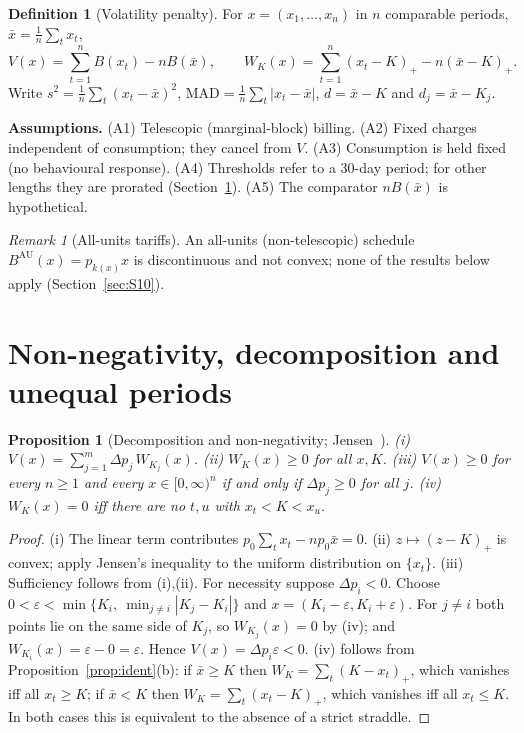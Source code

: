\documentclass[11pt,a4paper]{article}
\newtheorem{proposition}{Proposition}
\theoremstyle{definition}
\newtheorem{definition}{Definition}
\theoremstyle{plain}\newtheorem{sprop}{Proposition}[section]\newtheorem{slemma}[sprop]{Lemma}\newtheorem{scor}[sprop]{Corollary}
\theoremstyle{definition}
\theoremstyle{remark}
\newtheorem{remark}{Remark}
\newcommand{\xbar}{\bar{x}}
\newcommand{\pos}[1]{\left(#1\right)_{+}}
\numberwithin{equation}{section}
\begin{document}
\begin{definition}[Volatility penalty]
For $x=(x_1,\dots,x_n)$ in $n$ comparable periods, $\xbar=\frac1n\sum_tx_t$,
\[
V(x)=\sum_{t=1}^nB(x_t)-nB(\xbar),\qquad W_K(x)=\sum_{t=1}^n\pos{x_t-K}-n\pos{\xbar-K}.
\]
Write $s^2=\frac1n\sum_t(x_t-\xbar)^2$, $\mathrm{MAD}=\frac1n\sum_t|x_t-\xbar|$, $d=\xbar-K$ and $d_j=\xbar-K_j$.
\end{definition}

\noindent\textbf{Assumptions.} (A1) Telescopic (marginal-block) billing. (A2) Fixed charges independent of consumption; they cancel from $V$. (A3) Consumption is held fixed (no behavioural response). (A4) Thresholds refer to a 30-day period; for other lengths they are prorated (Section~\ref{sec:S2}). (A5) The comparator $nB(\xbar)$ is hypothetical.

\begin{remark}[All-units tariffs]
An all-units (non-telescopic) schedule $B^{\mathrm{AU}}(x)=p_{k(x)}x$ is discontinuous and not convex; none of the results below apply (Section~\ref{sec:S10}).
\end{remark}

\section{Non-negativity, decomposition and unequal periods}\label{sec:S2}

\setcounter{proposition}{0}\begin{proposition}[Decomposition and non-negativity; Jensen~\cite{jensen}]\label{prop:nonneg}
(i) $V(x)=\sum_{j=1}^m\Delta p_j\,W_{K_j}(x)$. (ii) $W_K(x)\ge0$ for all $x,K$. (iii) $V(x)\ge0$ for every $n\ge1$ and every $x\in[0,\infty)^n$ if and only if $\Delta p_j\ge0$ for all $j$. (iv) $W_K(x)=0$ iff there are no $t,u$ with $x_t<K<x_u$.
\end{proposition}
\begin{proof}
(i) The linear term contributes $p_0\sum_tx_t-np_0\xbar=0$. (ii) $z\mapsto\pos{z-K}$ is convex; apply Jensen's inequality to the uniform distribution on $\{x_t\}$. (iii) Sufficiency follows from (i),(ii). For necessity suppose $\Delta p_i<0$. Choose $0<\varepsilon<\min\{K_i,\ \min_{j\ne i}|K_j-K_i|\}$ and $x=(K_i-\varepsilon,K_i+\varepsilon)$. For $j\ne i$ both points lie on the same side of $K_j$, so $W_{K_j}(x)=0$ by (iv); and $W_{K_i}(x)=\varepsilon-0=\varepsilon$. Hence $V(x)=\Delta p_i\varepsilon<0$. (iv) follows from Proposition~\ref{prop:ident}(b): if $\xbar\ge K$ then $W_K=\sum_t\pos{K-x_t}$, which vanishes iff all $x_t\ge K$; if $\xbar<K$ then $W_K=\sum_t\pos{x_t-K}$, which vanishes iff all $x_t\le K$. In both cases this is equivalent to the absence of a strict straddle.
\end{proof}
\end{document}
